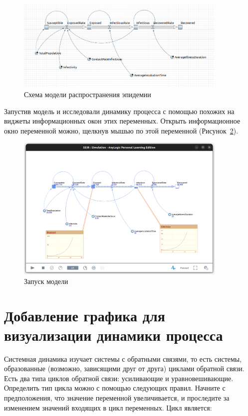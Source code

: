 \begin{figure}[h!tp]
	\centering
	\includegraphics[width=0.9\textwidth]{Screenshot from 2023-03-19 15-39-48}
	\caption{Схема модели распространения эпидемии}
	\label{fig:epidemic:complite}
\end{figure}

Запустив модель и исследовали динамику процесса с помощью похожих на
виджеты информационных окон этих переменных.
Открыть информационное окно переменной можно, щелкнув мышью по этой
переменной (Рисунок~\ref{fig:epidemic:run}).

\begin{figure}[h!tp]
	\centering
	\includegraphics[width=0.9\textwidth]{Screenshot from 2023-03-19 15-46-00}
	\caption{Запуск модели}
	\label{fig:epidemic:run}
\end{figure}

\section{Добавление графика для визуализации динамики процесса}
Системная динамика изучает системы с обратными связями, то есть системы,
образованные (возможно, зависящими друг от друга) циклами обратной связи.
Есть два типа циклов обратной связи: усиливающие и уравновешивающие.
Определить тип цикла можно с помощью следующих правил.
Начните с предположения, что значение переменной увеличивается, и
проследите за изменением значений входящих в цикл переменных.
Цикл является:

